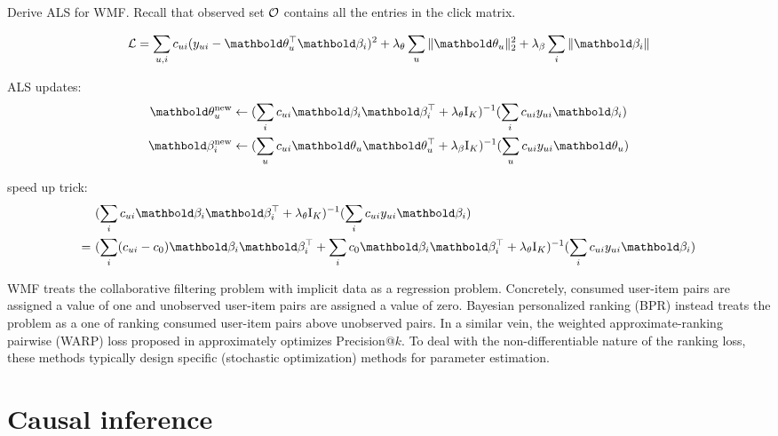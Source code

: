 \PP Derive ALS for \gls{WMF}. Recall that observed set $\mathcal{O}$ contains all the entries in the click matrix.

\begin{equation*}
\cL = \sum_{u, i} c_{ui}(y_{ui} - \mb\theta_u^\top\mb\beta_i)^2 + \lambda_\theta \sum_u \|\mb\theta_u \|^2_2 + \lambda_\beta \sum_i \|\mb\beta_i \|
\end{equation*}

\PP ALS updates:
\begin{equation}
\begin{split}
\mb\theta_u^\new &\leftarrow (\sum_i c_{ui} \mb\beta_i \mb\beta_i^\top + \lambda_\theta \mathrm{I}_K)^{-1} (\sum_i c_{ui} y_{ui} \mb\beta_i)\\
\mb\beta_i^\new &\leftarrow (\sum_u c_{ui} \mb\theta_u \mb\theta_u^\top + \lambda_\beta \mathrm{I}_K)^{-1} (\sum_u c_{ui} y_{ui} \mb\theta_u)
\end{split}
\label{chpt:background:eq:als_wmf}
\end{equation}

\PP speed up trick:
\begin{align*}
&(\sum_i c_{ui} \mb\beta_i \mb\beta_i^\top + \lambda_\theta \mathrm{I}_K)^{-1} (\sum_i c_{ui} y_{ui} \mb\beta_i)\\
=~& (\sum_i (c_{ui} - c_0) \mb\beta_i \mb\beta_i^\top + \sum_i c_0 \mb\beta_i \mb\beta_i^\top + \lambda_\theta \mathrm{I}_K)^{-1} (\sum_i c_{ui} y_{ui} \mb\beta_i)
\end{align*}

\gls{WMF} treats the collaborative filtering problem with implicit data as a
regression problem. Concretely, consumed user-item pairs are assigned a
value of one and unobserved user-item pairs are assigned a value of zero.
Bayesian personalized ranking (BPR) \citep{rendle2009bpr,
rendle2014improving} instead treats the problem as a one of ranking
consumed user-item pairs above unobserved pairs.
In a similar vein, the weighted approximate-ranking pairwise (WARP) loss
proposed in \citet{weston2011wsabie} approximately optimizes Precision@$k$. 
To deal with the non-differentiable nature of the ranking
loss, these methods typically design specific (stochastic optimization)
methods for parameter estimation.


\section{Causal inference}\label{chpt:background:sec:causal}

